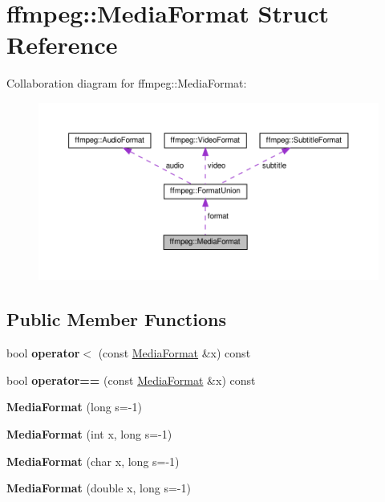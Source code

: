 \hypertarget{structffmpeg_1_1MediaFormat}{}\section{ffmpeg\+:\+:Media\+Format Struct Reference}
\label{structffmpeg_1_1MediaFormat}


Collaboration diagram for ffmpeg\+:\+:Media\+Format\+:
\nopagebreak
\begin{figure}[H]
\begin{center}
\leavevmode
\includegraphics[width=350pt]{structffmpeg_1_1MediaFormat__coll__graph}
\end{center}
\end{figure}
\subsection*{Public Member Functions}
\begin{DoxyCompactItemize}
\item 
\mbox{\label{structffmpeg_1_1MediaFormat_ae462123b68446ad066f6df6be333beba}} 
bool {\bfseries operator$<$} (const \hyperlink{structffmpeg_1_1MediaFormat}{Media\+Format} \&x) const
\item 
\mbox{\label{structffmpeg_1_1MediaFormat_a42ecbb5e22ca46fedc3644cfffbb0e4b}} 
bool {\bfseries operator==} (const \hyperlink{structffmpeg_1_1MediaFormat}{Media\+Format} \&x) const
\item 
\mbox{\label{structffmpeg_1_1MediaFormat_a10b8ff8f77e016620ece386c7b92a4f1}} 
{\bfseries Media\+Format} (long s=-\/1)
\item 
\mbox{\label{structffmpeg_1_1MediaFormat_afa6ebbd252db743212d55d79b7425031}} 
{\bfseries Media\+Format} (int x, long s=-\/1)
\item 
\mbox{\label{structffmpeg_1_1MediaFormat_ad0e83c70a07b318e800180dca44da8f8}} 
{\bfseries Media\+Format} (char x, long s=-\/1)
\item 
\mbox{\label{structffmpeg_1_1MediaFormat_a2388c56c18459cf8fef2602a9e5c8890}} 
{\bfseries Media\+Format} (double x, long s=-\/1)
\end{DoxyCompactItemize}

